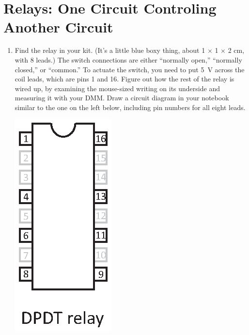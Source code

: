 \section{Relays: One Circuit Controling Another Circuit}
\label{lab_relays}


\bigskip

\begin{enumerate}[wide]

\item Find the relay in your kit.  (It's a little blue boxy thing, about 1 $\times$ 1 $\times$ 2 cm, with 8 leads.)  
The switch connections are either ``normally open,'' ``normally closed,'' or ``common.''
To actuate the switch, you need to put 5~V across the coil leads, which are pins 1 and 16.
Figure out how the rest of the relay is wired up, by examining the mouse-sized writing on its underside and measuring it with your DMM.
Draw a circuit diagram in your notebook similar to the one on the left below, including pin numbers for all eight leads.    
\begin{center}
\hspace{0.6in}
\includegraphics[scale=0.8]{relays/relay_pinout.eps}
\end{center}


\end{enumerate}

